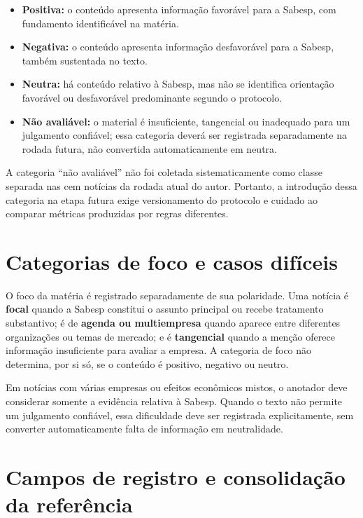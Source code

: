 \begin{itemize}
    \item \textbf{Positiva:} o conteúdo apresenta informação favorável para a Sabesp, com fundamento identificável na matéria.
    \item \textbf{Negativa:} o conteúdo apresenta informação desfavorável para a Sabesp, também sustentada no texto.
    \item \textbf{Neutra:} há conteúdo relativo à Sabesp, mas não se identifica orientação favorável ou desfavorável predominante segundo o protocolo.
    \item \textbf{Não avaliável:} o material é insuficiente, tangencial ou inadequado para um julgamento confiável; essa categoria deverá ser registrada separadamente na rodada futura, não convertida automaticamente em neutra.
\end{itemize}

A categoria ``não avaliável'' não foi coletada sistematicamente como classe separada nas cem notícias da rodada atual do autor. Portanto, a introdução dessa categoria na etapa futura exige versionamento do protocolo e cuidado ao comparar métricas produzidas por regras diferentes.

\section{Categorias de foco e casos difíceis}

O foco da matéria é registrado separadamente de sua polaridade. Uma notícia é \textbf{focal} quando a Sabesp constitui o assunto principal ou recebe tratamento substantivo; é de \textbf{agenda ou multiempresa} quando aparece entre diferentes organizações ou temas de mercado; e é \textbf{tangencial} quando a menção oferece informação insuficiente para avaliar a empresa. A categoria de foco não determina, por si só, se o conteúdo é positivo, negativo ou neutro.

Em notícias com várias empresas ou efeitos econômicos mistos, o anotador deve considerar somente a evidência relativa à Sabesp. Quando o texto não permite um julgamento confiável, essa dificuldade deve ser registrada explicitamente, sem converter automaticamente falta de informação em neutralidade.

\section{Campos de registro e consolidação da referência}


